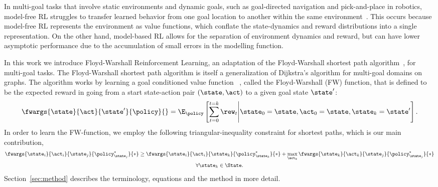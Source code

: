 In multi-goal tasks that involve static environments and dynamic goals,
such as goal-directed navigation and pick-and-place in robotics,
model-free RL struggles to transfer learned behavior from one goal
location to another within the same
environment~\citep{dhiman2018critical,quillen2018deep}. This occurs because model-free
RL represents the environment as value functions, which conflate the
state-dynamics and reward distributions into a single representation.
On the other hand, model-based RL allows for the separation of
environment dynamics and reward, but can have lower asymptotic
performance due to the accumulation of small errors in the modelling function.

In this work we introduce Floyd-Warshall Reinforcement Learning, an
adaptation of the Floyd-Warshall shortest path
algorithm~\citep{floydwarshall1962}, for multi-goal tasks.
The Floyd-Warshall shortest path algorithm is itself a generalization of
Dijkstra's algorithm for multi-goal domains on graphs. The algorithm works
by learning a goal conditioned value function
~\citep{schaul2015universal}, called the Floyd-Warshall (FW) function,
that is defined to be the expected reward in going from a start
state-action pair $(\state, \act)$ to a given goal state $\state'$:
%
\begin{align}
\fwargs{\state}{\act}{\state'}{\policy}{} =
\E_{\policy}\left[ \sum_{t=0}^{t=k} \rew_t \middle\vert \state_0 = \state, \act_0 = \state, \state_k = \state' \right] .
\end{align}%
%
In order to learn the FW-function, we employ the following
triangular-inequality constraint for shortest paths, which is our main
contribution,
%
\begin{multline}
\fwargs{\state_i}{\act_i}{\state_j}{\policy^*_{\state_j}}{*}
 \ge 
  \fwargs{\state_i}{\act_i}{\state_k}{\policy^*_{\state_k}}{*}
  + \max_{\act_k}\fwargs{\state_k}{\act_k}{\state_j}{\policy^*_{\state_j}}{*}
  \\
  \forall \state_k \in \State.
  \label{eq:fwconstraint}
\end{multline}%
%
Section~\ref{sec:method} describes the terminology, equations and the method in more detail.

